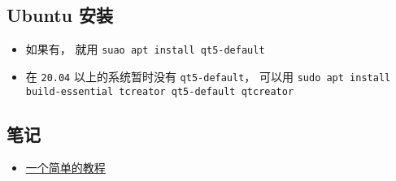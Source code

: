 
\subsection{Ubuntu 安装}
\begin{itemize}
\item 如果有， 就用 \verb|suao apt install qt5-default|
\item 在 \verb|20.04| 以上的系统暂时没有 \verb|qt5-default|， 可以用 \verb|sudo apt install build-essential tcreator qt5-default qtcreator|
\end{itemize}

\subsection{笔记}
\begin{itemize}
\item \href{https://doc.qt.io/qt-5/qtdoc-tutorials-alarms-example.html}{一个简单的教程}
\end{itemize}
